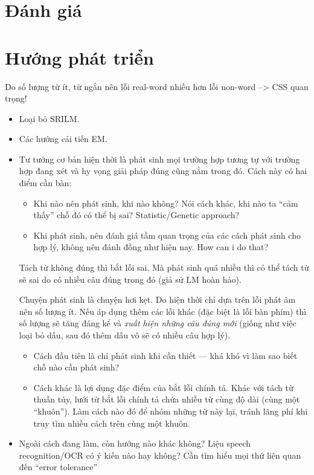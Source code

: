\documentclass[a4paper,oneside,14pt]{extbook} %
\begin{document}
\section{Đánh giá}


\section{Hướng phát triển}
\label{sec:todo}

Do số lượng từ ít, từ ngắn nên lỗi real-word nhiều hơn lỗi non-word --> CSS quan trọng! 

\begin{itemize}
\item Loại bỏ SRILM.
\item Các hướng cải tiến EM.
\item Tư tưởng cơ bản hiện thời là phát sinh mọi trường hợp tương tự
  với trường hợp đang xét và hy vọng giải pháp đúng cũng nằm trong
  đó. Cách này có hai điểm cần bàn:
  \begin{itemize}
  \item Khi nào nên phát sinh, khi nào không? Nói cách khác, khi nào
    ta ``cảm thấy'' chỗ đó có thể bị sai? Statistic/Genetic approach?
  \item Khi phát sinh, nên đánh giá tầm quan trọng của các cách phát
    sinh  cho hợp lý, không nên đánh đồng như hiện nay. How can i do
    that?
  \end{itemize}

  Tách từ không đúng thì bắt lỗi sai. Mà phát sinh quá nhiều thì có
  thể tách từ sẽ sai do có nhiều câu đúng trong đó (giả sử LM hoàn
  hảo). 

  Chuyện phát sinh là chuyện hơi kẹt. Do hiện thời chỉ dựa trên lỗi
  phát âm nên số lượng ít. Nếu áp dụng thêm các lỗi khác (đặc biệt là
  lỗi bàn phím) thì số lượng sẽ tăng đáng kể và {\em xuất hiện những
  câu đúng mới} (giống như việc loại bỏ dấu, sau đó thêm dấu vô sẽ có
  nhiều câu hợp lý). 
  \begin{itemize}
  \item Cách đầu tiên là chỉ phát sinh khi cần thiết ---
    khá khó vì làm sao biết chỗ nào cần phát sinh?
  \item Cách khác là lợi dụng đặc điểm của bắt lỗi chính tả. Khác với
    tách từ thuần túy, lưới từ bắt lỗi chính tả chứa nhiều từ cùng độ
    dài (cùng một ``khuôn''). Làm cách nào đó để nhóm những từ này
    lại, tránh lãng phí khi truy tìm nhiều cách trên cùng một khuôn. 
  \end{itemize}
\item Ngoài cách đang làm, còn hướng nào khác không? Liệu speech
  recognition/OCR có ý kiến nào hay không? Cần tìm hiểu mọi thứ liên
  quan đến ``error tolerance''
\end{itemize}
\end{document}

